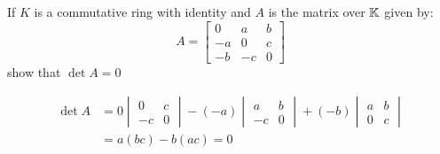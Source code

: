 \documentclass[a4paper, 11pt]{article}
\begin{document}
\begin{problem} 
If \(K\) is a commutative ring with identity and \(A\) is the matrix over \(\mathbb{K}\) given by:
\[
    A = \left[\begin{array}{ccc}
            0  & a  & b \\
            -a & 0  & c \\
            -b & -c & 0
        \end{array}\right]
\]
show that \(\det A = 0\)
\end{problem}
\begin{solution}
    \begin{align*}
        \det A & = 0 \begin{vmatrix}
                         0  & c \\
                         -c & 0
                     \end{vmatrix} - (-a) \begin{vmatrix}
                                              a  & b \\
                                              -c & 0
                                          \end{vmatrix} + (-b) \begin{vmatrix}
                                                                   a & b \\
                                                                   0 & c
                                                               \end{vmatrix} \\
               & =a(bc) - b(ac) = 0
    \end{align*}
\end{solution}
\end{document}
